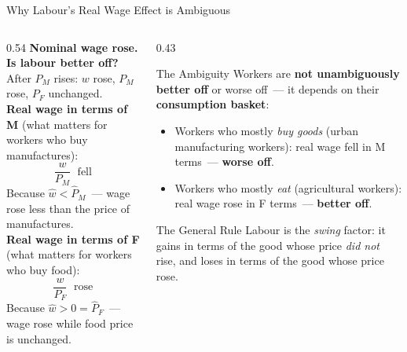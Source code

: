 \documentclass[aspectratio=169]{beamer}
\begin{document}
\begin{frame}[shrink=18]{Why Labour's Real Wage Effect is Ambiguous}
\begin{columns}[T]
\begin{column}{0.54\textwidth}
\textbf{Nominal wage rose.  Is labour better off?}\\[0.3em]
After $P_M$ rises: $w$ rose, $P_M$ rose, $P_F$ unchanged.\\[0.3em]
\textbf{Real wage in terms of M} (what matters for
workers who buy manufactures):
\[\frac{w}{P_M} \;\text{ fell}\]
Because $\hat{w} < \hat{P}_M$~--- wage rose less than
the price of manufactures.\\[0.4em]
\textbf{Real wage in terms of F} (what matters for
workers who buy food):
\[\frac{w}{P_F} \;\text{ rose}\]
Because $\hat{w} > 0 = \hat{P}_F$~--- wage rose while
food price is unchanged.
\end{column}
\begin{column}{0.43\textwidth}
\begin{alertblock}{The Ambiguity}
Workers are \textbf{not unambiguously better off} or
worse off~--- it depends on their \textbf{consumption
basket}:\\[0.2em]
\begin{itemize}\small
  \item Workers who mostly \emph{buy goods} (urban
        manufacturing workers): real wage fell in M
        terms~--- \textbf{worse off}.
  \item Workers who mostly \emph{eat} (agricultural
        workers): real wage rose in F terms~---
        \textbf{better off}.
\end{itemize}
\end{alertblock}
\vspace{0.3em}
\begin{insight}{The General Rule}
\footnotesize Labour is the \emph{swing} factor: it
gains in terms of the good whose price \emph{did not}
rise, and loses in terms of the good whose price rose.
\end{insight}
\end{column}
\end{columns}
\end{frame}
\end{document}
